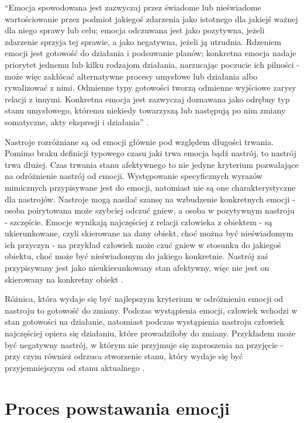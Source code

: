 ``Emocja spowodowana jest zazwyczaj przez świadome lub nieświadome wartościowanie przez podmiot jakiegoś zdarzenia jako istotnego dla jakiejś ważnej dla niego sprawy lub celu; emocja odczuwana jest jako pozytywna, jeżeli zdarzenie sprzyja tej sprawie, a jako negatywna, jeżeli ją utrudnia. Rdzeniem emocji jest gotowość do działania i podsuwanie planów; konkretna emocja nadaje priorytet jednemu lub kilku rodzajom działania, narzucając poczucie ich pilności - może więc zakłócać alternatywne procesy umysłowe lub działania albo rywalizować z nimi. Odmienne typy gotowości tworzą odmienne wyjściowe zarysy relacji z innymi. Konkretna emocja jest zazwyczaj doznawana jako odrębny typ stanu umysłowego, któremu niekiedy towarzyszą lub następują po nim zmiany somatyczne, akty ekspresji i działania'' \citep[s.~95]{oatly}.

Nastroje rozróżniane są od emocji głównie pod względem długości trwania. Pomimo braku definicji typowego czasu jaki trwa emocja bądź nastrój, to nastrój trwa dłużej. Czas trwania stanu afektywnego to nie jedyne kryterium pozwalające na odróżnienie nastrój od emocji. Występowanie specyficznych wyrazów mimicznych przypisywane jest do emocji, natomiast nie są one charakterystyczne dla nastrojów. Nastroje mogą nasilać szansę na wzbudzenie konkretnych emocji - osoba poirytowana może szybciej odczuć gniew, a osoba w pozytywnym nastroju - szczęście. Emocje wynikają najczęściej z relacji człowieka z obiektem - są ukierunkowane, czyli skierowane na dany obiekt, choć można być nieświadomym ich przyczyn - na przykład człowiek może czuć gniew w stosunku do jakiegoś obiektu, choć może być nieświadomym do jakiego konkretnie. Nastrój zaś przypisywany jest jako nieukierunkowany stan afektywny, więc nie jest on skierowany na konkretny obiekt  \citep{ekman}.

Różnica, która wydaje się być najlepszym kryterium w odróżnieniu emocji od nastroju to gotowość do zmiany. Podczas wystąpienia emocji, człowiek wchodzi w stan gotowości na działanie, natomiast podczas wystąpienia nastroju człowiek najczęściej opiera się działaniu, które prowadziłoby do zmiany. Przykładem może być negatywny nastrój, w którym nie przyjmuje się zaproszenia na przyjęcie - przy czym również odrzuca stworzenie stanu, który wydaje się być przyjemniejszym od stanu aktualnego \citep{oatly}.

\section{Proces powstawania emocji}


